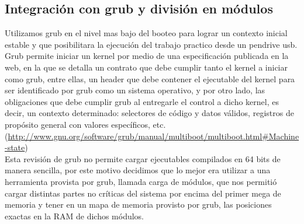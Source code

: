 	 \subsection{Integración con grub y división en módulos}

	Utilizamos grub en el nivel mas bajo del booteo para lograr un contexto inicial estable y que posibilitara la ejecución del trabajo practico desde un pendrive usb.\\

	Grub permite iniciar un kernel por medio de una especificación publicada en la web, en la que se detalla un contrato que debe cumplir tanto el kernel a iniciar como grub, entre ellas, un header que debe contener el ejecutable del kernel para ser identificado por grub como un sistema operativo, y por otro lado, las obligaciones que debe cumplir grub al entregarle el control a dicho kernel, es decir, un contexto determinado: selectores de código y datos válidos, registros de propósito general con valores específicos, etc.\\
	(\url{http://www.gnu.org/software/grub/manual/multiboot/multiboot.html#Machine-state})\\

	Esta revisión de grub no permite cargar ejecutables compilados en 64 bits de manera sencilla, por este motivo decidimos que lo mejor era utilizar a una herramienta provista por grub, llamada carga de módulos, que nos permitió cargar distintas partes no críticas del sistema por encima del primer mega de memoria y tener en un mapa de memoria provisto por grub, las posiciones exactas en la RAM de dichos módulos.\\ 

